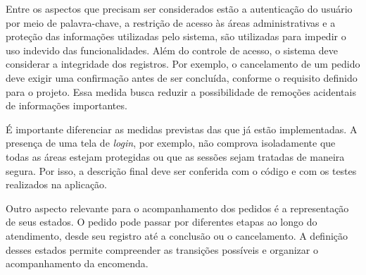 Entre os aspectos que precisam ser considerados estão a autenticação do usuário por meio de palavra-chave, a restrição de acesso às áreas administrativas e a proteção das informações utilizadas pelo sistema, são utilizadas para impedir o uso indevido das funcionalidades. Além do controle de acesso, o sistema deve considerar a integridade dos registros. Por exemplo, o cancelamento de um pedido deve exigir uma confirmação antes de ser concluída, conforme o requisito definido para o projeto. Essa medida busca reduzir a possibilidade de remoções acidentais de informações importantes.

É importante diferenciar as medidas previstas das que já estão implementadas. A presença de uma tela de \textit{login}, por exemplo, não comprova isoladamente que todas as áreas estejam protegidas ou que as sessões sejam tratadas de maneira segura. Por isso, a descrição final deve ser conferida com o código e com os testes realizados na aplicação.

Outro aspecto relevante para o acompanhamento dos pedidos é a representação de seus estados. O pedido pode passar por diferentes etapas ao longo do atendimento, desde seu registro até a conclusão ou o cancelamento. A definição desses estados permite compreender as transições possíveis e organizar o acompanhamento da encomenda.

